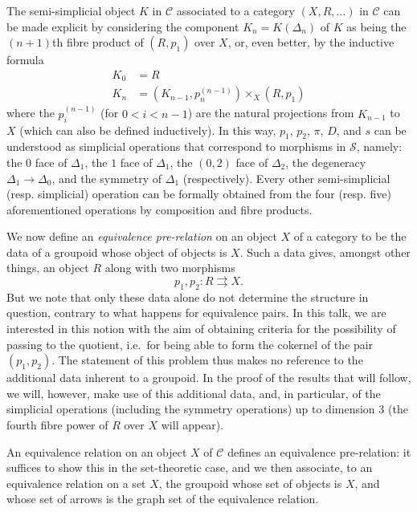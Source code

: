 \documentclass{article}
\newcommand{\oldpage}[1]{\marginpar{\footnotesize$\Big\vert$ \textit{p.~#1}}}
\theoremstyle{definition}
\theoremstyle{definition}
\theoremstyle{definition}
\theoremstyle{definition}
\theoremstyle{remark}
\begin{document}
The semi-simplicial object \(K\) in \({\mathcal{C}}\) associated to a category \((X,R,\ldots)\) in \({\mathcal{C}}\) can be made explicit by considering the component \(K_n=K(\Delta_n)\) of \(K\) as being the \((n+1)\)th fibre product of \((R,p_1)\) over \(X\), or, even better, by the inductive formula
\[
  \begin{aligned}
    K_0 &= R
  \\K_n &= (K_{n-1},p_n^{(n-1)})\times_X(R,p_1)
  \end{aligned}
\]
where the \(p_i^{(n-1)}\) (for \(0<i<n-1\)) are the natural projections from \(K_{n-1}\) to \(X\) (which can also be defined inductively).
In this way, \(p_1\), \(p_2\), \(\pi\), \(D\), and \(s\) can be understood as simplicial operations that correspond to morphisms in \({\mathcal{S}}\), namely: the \(0\) face of \(\Delta_1\), the \(1\) face of \(\Delta_1\), the \((0,2)\) face of \(\Delta_2\), the degeneracy \(\Delta_1\to\Delta_0\), and the symmetry of \(\Delta_1\) (respectively).
Every other semi-simplicial (resp. simplicial) operation can be formally obtained from the four (resp. five) aforementioned operations by composition and fibre products.

We now define an \emph{equivalence pre-relation} on an object \(X\) of a category to be the data of a groupoid whose object of objects is \(X\).
Such a data gives, amongst other things, an object \(R\) along with two morphisms
\[
  p_1,p_2\colon R\rightrightarrows X.
\]
But we note that only these data alone do not determine the structure in question, contrary to what happens for equivalence pairs.
In this talk, we are interested in this notion with the aim of obtaining criteria for the possibility of passing to the quotient, i.e.~for being able to form the cokernel of the pair \((p_1,p_2)\).
The statement of this problem thus makes no reference to the additional data inherent to a groupoid.
\oldpage{212-12}In the proof of the results that will follow, we will, however, make use of this additional data, and, in particular, of the simplicial operations (including the symmetry operations) up to dimension \(3\) (the fourth fibre power of \(R\) over \(X\) will appear).

An equivalence relation on an object \(X\) of \({\mathcal{C}}\) defines an equivalence pre-relation: it suffices to show this in the set-theoretic case, and we then associate, to an equivalence relation on a set \(X\), the groupoid whose set of objects is \(X\), and whose set of arrows is the graph set of the equivalence relation.
\end{document}

